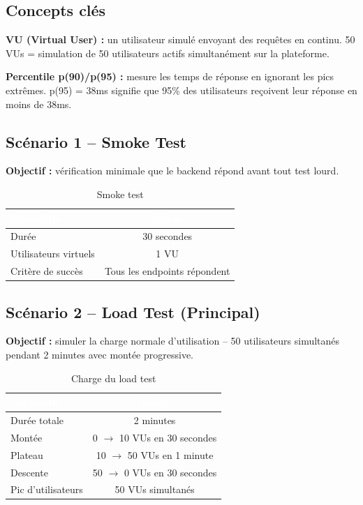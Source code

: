 \documentclass[12pt,a4paper]{report}
\newcommand{\thead}[1]{\cellcolor{tablehead}\textcolor{white}{\textbf{#1}}}
\begin{document}
\subsection{Concepts clés}

\textbf{VU (Virtual User) :} un utilisateur simulé envoyant des requêtes
en continu. 50 VUs = simulation de 50 utilisateurs actifs simultanément
sur la plateforme.

\textbf{Percentile p(90)/p(95) :} mesure les temps de réponse en ignorant
les pics extrêmes. p(95) = 38ms signifie que 95\% des utilisateurs
reçoivent leur réponse en moins de 38ms.

\subsection{Scénario 1 -- Smoke Test}

\textbf{Objectif :} vérification minimale que le backend répond avant tout
test lourd.

\begin{table}[H]
  \centering
  \caption{Smoke test}
  \label{tab:tests_smoke}
  \begin{tabularx}{\textwidth}{|l|c|}
    \hline
    \thead{Paramètre} & \thead{Valeur} \\
    \hline
    Durée & 30 secondes \\
    Utilisateurs virtuels & 1 VU \\
    Critère de succès & Tous les endpoints répondent \\
    \hline
  \end{tabularx}
\end{table}

\subsection{Scénario 2 -- Load Test (Principal)}

\textbf{Objectif :} simuler la charge normale d'utilisation -- 50
utilisateurs simultanés pendant 2 minutes avec montée progressive.

\begin{table}[H]
  \centering
  \caption{Charge du load test}
  \label{tab:tests_load_param}
  \begin{tabularx}{\textwidth}{|l|c|}
    \hline
    \thead{Paramètre} & \thead{Valeur} \\
    \hline
    Durée totale & 2 minutes \\
    Montée & 0 $\rightarrow$ 10 VUs en 30 secondes \\
    Plateau & 10 $\rightarrow$ 50 VUs en 1 minute \\
    Descente & 50 $\rightarrow$ 0 VUs en 30 secondes \\
    Pic d'utilisateurs & 50 VUs simultanés \\
    \hline
  \end{tabularx}
\end{table}
\end{document}
